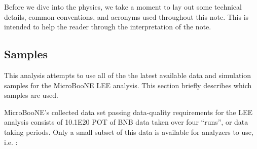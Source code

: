 Before we dive into the physics, we take a moment to lay out some technical details, common conventions, and acronyms used throughout this note. This is intended to help the reader through the interpretation of the note.
\subsection{Samples}
\par This analysis attempts to use all of the the latest available data and simulation samples for the MicroBooNE LEE analysis. This section briefly describes which samples are used.
\par MicroBooNE's collected data set passing  data-quality requirements for the LEE analysis consists of 10.1E20 POT of BNB data taken over four ``runs'', or data taking periods. %
Only a small subset of this data is available for analyzers to use, i.e. :
